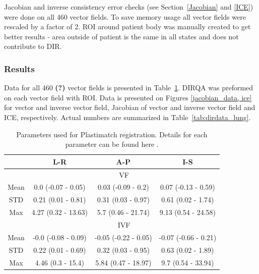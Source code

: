 \documentclass[type=dr, dr=rernat, accentcolor=tud7b,colorbacktitle, bigchapter, openright, twoside, 12pt ]{tudthesis}
\begin{document}
Jacobian and inverse consistency error checks (see Section~\ref{Jacobian} and \ref{ICE}) were done on all 460 vector fields. To save memory usage all vector fields were rescaled by a factor of 2. ROI around patient body was manually created to
get better results - area outside of patient is the same in all states and does not contribute to DIR.

\subsubsection{Results}

Data for all 460 \textbf{(?)} vector fields is presented in Table~\ref{tab:vectordata_lung}. DIRQA was preformed on each vector field with ROI. Data is presented on Figures \ref{jacobian_data, ice} for vector and inverse vector field, Jacobian of vector and inverse vector field and ICE, respectively.
Actual numbers are summarized in Table~\ref{tab:dirdata_lung}.

\begin{table}[H]
  \centering
  \caption{Parameters used for Plastimatch registration. Details for each parameter can be found here \cite{Plastimatch}.}
  \begin{tabular}{c|c|c|c}
  
       & L-R & A-P & I-S  \\
       \hline
        & \multicolumn{3}{|c}{VF} \\ 
        \hline
	Mean & 0.0 (-0.07 - 0.05) & 0.03 (-0.09 - 0.2) & 0.07 (-0.13 - 0.59) \\ 
	STD & 0.21 (0.01 - 0.81) & 0.31 (0.03 - 0.97) & 0.61 (0.02 - 1.74) \\ 
	Max & 4.27 (0.32 - 13.63) & 5.7 (0.46 - 21.74) & 9.13 (0.54 - 24.58) \\ 
	\hline
	&\multicolumn{3}{|c}{IVF}  \\
	\hline
	Mean & -0.0 (-0.08 - 0.09) & -0.05 (-0.22 - 0.05) & -0.07 (-0.66 - 0.21) \\ 
	STD & 0.22 (0.01 - 0.69) & 0.32 (0.03 - 0.95) & 0.63 (0.02 - 1.89) \\ 
	Max & 4.46 (0.3 - 15.4) & 5.84 (0.47 - 18.97) & 9.7 (0.54 - 33.94) \\ 

    \hline\hline
  \end{tabular}
  \label{tab:vectordata_lung}
\end{table}
\end{document}
